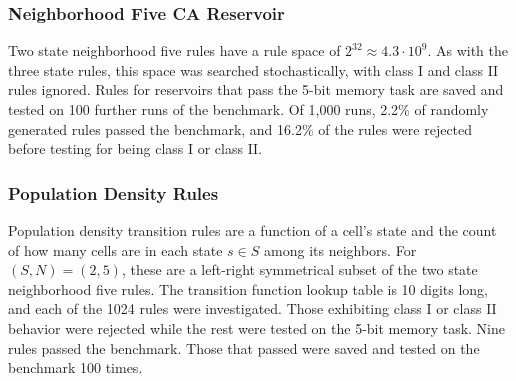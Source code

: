 \documentclass{elsarticle}
\begin{document}
\begin{multicols}{2}
\subsubsection{Neighborhood Five CA Reservoir}
Two state neighborhood five rules have a rule space of $2^32 \approx 4.3 \cdot 
   10^9$. As with the three state rules, this space was searched 
   stochastically, with class I and class II rules ignored. Rules for 
   reservoirs that pass the 5-bit memory task are saved and tested on 100 
   further runs of the benchmark. Of 1,000 runs, 2.2\% of randomly generated 
   rules passed the benchmark, and 16.2\% of the rules were rejected before 
   testing for being class I or class II.
\subsubsection{Population Density Rules}
Population density transition rules are a function of a cell's state and the 
    count of how many cells are in each state $s \in S$ among its neighbors.  
    For $(S,N) = (2,5)$, these are a left-right symmetrical subset of the two 
    state neighborhood five rules. The transition function lookup table is 10 
    digits long, and each of the 1024 rules were investigated. Those exhibiting 
    class I or class II behavior were rejected while the rest were tested on 
    the 5-bit memory task. Nine rules passed the benchmark. Those that passed 
    were saved and tested on the benchmark 100 times.


\end{multicols}
\end{document}
